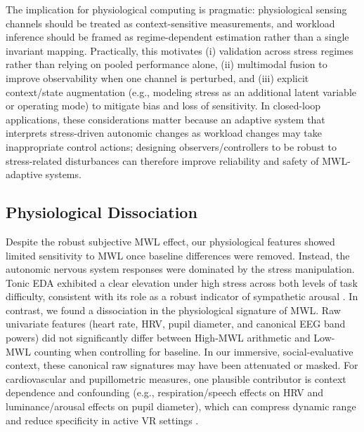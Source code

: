 \documentclass[lettersize,journal]{IEEEtran}
\begin{document}

The implication for physiological computing is pragmatic: physiological sensing channels should be treated as context-sensitive measurements, and workload inference should be framed as regime-dependent estimation rather than a single invariant mapping. Practically, this motivates (i) validation across stress regimes rather than relying on pooled performance alone, (ii) multimodal fusion to improve observability when one channel is perturbed, and (iii) explicit context/state augmentation (e.g., modeling stress as an additional latent variable or operating mode) to mitigate bias and loss of sensitivity. In closed-loop applications, these considerations matter because an adaptive system that interprets stress-driven autonomic changes as workload changes may take inappropriate control actions; designing observers/controllers to be robust to stress-related disturbances can therefore improve reliability and safety of MWL-adaptive systems.

\subsection{Physiological Dissociation}

Despite the robust subjective MWL effect, our physiological features showed limited sensitivity to MWL once baseline differences were removed. Instead, the autonomic nervous system responses were dominated by the stress manipulation. Tonic EDA exhibited a clear elevation under high stress across both levels of task difficulty, consistent with its role as a robust indicator of sympathetic arousal \cite{faircloughFundamentalsPhysiologicalComputing2009, masiStressWorkloadAssessment2023, goodmanMetaanalyticalAssessmentEffects2017, manMultisystemicEvaluationBiological2023}. In contrast, we found a dissociation in the physiological signature of MWL. Raw univariate features (heart rate, HRV, pupil diameter, and canonical EEG band powers) did not significantly differ between High-MWL arithmetic and Low-MWL counting when controlling for baseline. In our immersive, social-evaluative context, these canonical raw signatures may have been attenuated or masked. For cardiovascular and pupillometric measures, one plausible contributor is context dependence and confounding (e.g., respiration/speech effects on HRV and luminance/arousal effects on pupil diameter), which can compress dynamic range and reduce specificity in active VR settings \cite{hughesCardiacMeasuresCognitiveWorkload2019, mathotPupillometryPsychologyPhysiology2017, panEmotionalArousalPupilLuminance2024}.
\end{document}
